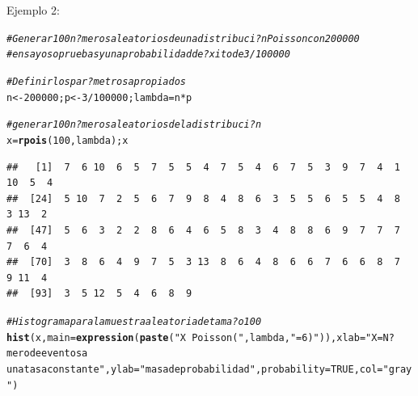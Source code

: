 \documentclass[10pt,a4paper]{article}\usepackage[]{graphicx}\usepackage[]{color}
\makeatletter
\newcommand{\hlnum}[1]{\textcolor[rgb]{0.686,0.059,0.569}{#1}}%
\newcommand{\hlstr}[1]{\textcolor[rgb]{0.192,0.494,0.8}{#1}}%
\newcommand{\hlcom}[1]{\textcolor[rgb]{0.678,0.584,0.686}{\textit{#1}}}%
\newcommand{\hlopt}[1]{\textcolor[rgb]{0,0,0}{#1}}%
\newcommand{\hlstd}[1]{\textcolor[rgb]{0.345,0.345,0.345}{#1}}%
\newcommand{\hlkwb}[1]{\textcolor[rgb]{0.69,0.353,0.396}{#1}}%
\newcommand{\hlkwc}[1]{\textcolor[rgb]{0.333,0.667,0.333}{#1}}%
\newcommand{\hlkwd}[1]{\textcolor[rgb]{0.737,0.353,0.396}{\textbf{#1}}}%
\newenvironment{kframe}{%
 \def\at@end@of@kframe{}%
 \ifinner\ifhmode%
  \def\at@end@of@kframe{\end{minipage}}%
  \begin{minipage}{\columnwidth}%
 \fi\fi%
 \def\FrameCommand##1{\hskip\@totalleftmargin \hskip-\fboxsep
 \colorbox{shadecolor}{##1}\hskip-\fboxsep
     \hskip-\linewidth \hskip-\@totalleftmargin \hskip\columnwidth}%
 \MakeFramed {\advance\hsize-\width
   \@totalleftmargin\z@ \linewidth\hsize
   \@setminipage}}%
 {\par\unskip\endMakeFramed%
 \at@end@of@kframe}
\newenvironment{knitrout}{}{} %
\makeatother
\begin{document}
Ejemplo 2: 
\begin{knitrout}
\color{fgcolor}\begin{kframe}
\begin{alltt}
\hlcom{#Generar 100 n?meros aleatorios de una distribuci?n Poisson con 200000 }
\hlcom{#ensayos o pruebas y una probabilidad de ?xito de 3/100000 }

\hlcom{# Definir los par?metros apropiados }
\hlstd{n} \hlkwb{<-} \hlnum{200000}\hlstd{; p} \hlkwb{<-} \hlnum{3}\hlopt{/}\hlnum{100000}\hlstd{; lambda}\hlkwb{=}\hlstd{n}\hlopt{*}\hlstd{p}

\hlcom{# generar 100 n?meros aleatorios de la distribuci?n }
\hlstd{x} \hlkwb{=} \hlkwd{rpois}\hlstd{(}\hlnum{100}\hlstd{, lambda); x}
\end{alltt}
\begin{verbatim}
##   [1]  7  6 10  6  5  7  5  5  4  7  5  4  6  7  5  3  9  7  4  1 10  5  4
##  [24]  5 10  7  2  5  6  7  9  8  4  8  6  3  5  5  6  5  5  4  8  3 13  2
##  [47]  5  6  3  2  2  8  6  4  6  5  8  3  4  8  8  6  9  7  7  7  7  6  4
##  [70]  3  8  6  4  9  7  5  3 13  8  6  4  8  6  6  7  6  6  8  7  9 11  4
##  [93]  3  5 12  5  4  6  8  9
\end{verbatim}
\begin{alltt}
\hlcom{# Histograma para la muestra aleatoria de tama?o 100 }
\hlkwd{hist}\hlstd{(x,} \hlkwc{main}\hlstd{=}\hlkwd{expression}\hlstd{(}\hlkwd{paste}\hlstd{(}\hlstr{"X ~ Poisson( "}\hlstd{, lambda,} \hlstr{" = 6 )"}\hlstd{)),} \hlkwc{xlab}\hlstd{=}\hlstr{"X = N?mero de eventos a 
una tasa constante"}\hlstd{,} \hlkwc{ylab}\hlstd{=}\hlstr{"masa de probabilidad"}\hlstd{,} \hlkwc{probability}\hlstd{=}\hlnum{TRUE}\hlstd{,} \hlkwc{col}\hlstd{=}\hlstr{"gray"}\hlstd{)}


\end{alltt}
\end{kframe}
\end{knitrout}
\end{document}
